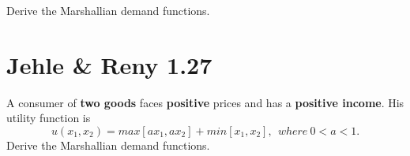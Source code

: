 \documentclass{article}
\begin{document}
Derive the Marshallian demand functions.


\section{Jehle \& Reny 1.27}
A consumer of \textbf{two goods} faces \textbf{positive} prices and has a \textbf{positive income}. 
His utility function is $$u(x_1, x_2) = max[ax_1, ax_2] + min[x_1, x_2], \ \ where \ 0 < a < 1.$$
Derive the Marshallian demand functions.
\end{document}
